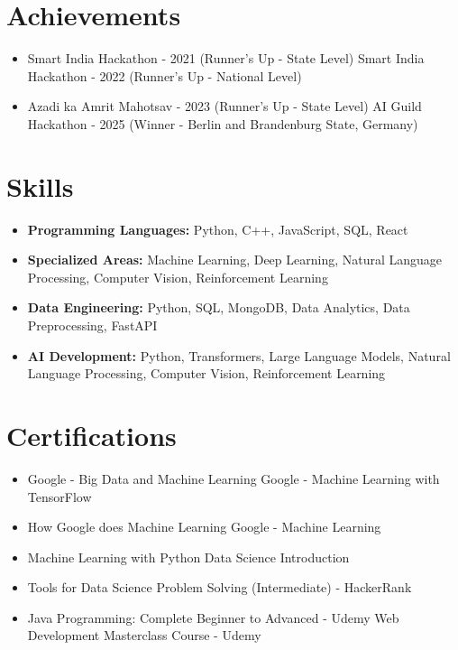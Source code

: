 \documentclass[a4paper,10pt]{article}
\begin{document}
\section*{Achievements}
\begin{itemize}
\item Smart India Hackathon - 2021 (Runner's Up - State Level) \hfill Smart India Hackathon - 2022 (Runner's Up - National Level)
\item Azadi ka Amrit Mahotsav - 2023 (Runner's Up - State Level) \hfill AI Guild Hackathon - 2025 (Winner - Berlin and Brandenburg State, Germany)
\end{itemize}

\section*{Skills}
\begin{itemize}
  \item \textbf{Programming Languages:} Python, C++, JavaScript, SQL, React
  \item \textbf{Specialized Areas:} Machine Learning, Deep Learning, Natural Language Processing, Computer Vision, Reinforcement Learning
  \item \textbf{Data Engineering:} Python, SQL, MongoDB, Data Analytics, Data Preprocessing, FastAPI
  \item \textbf{AI Development:} Python, Transformers, Large Language Models, Natural Language Processing, Computer Vision, Reinforcement Learning
\end{itemize}

\section*{Certifications}
\begin{itemize}
\item Google - Big Data and Machine Learning \hfill Google - Machine Learning with TensorFlow
\item How Google does Machine Learning \hfill Google - Machine Learning
\item Machine Learning with Python \hfill Data Science Introduction
\item Tools for Data Science \hfill Problem Solving (Intermediate) - HackerRank
\item Java Programming: Complete Beginner to Advanced - Udemy \hfill Web Development Masterclass Course - Udemy
\end{itemize}
\end{document}
